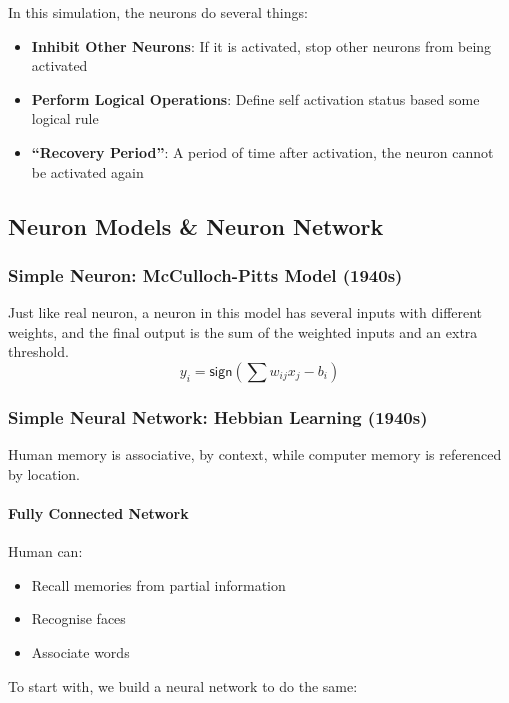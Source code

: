 \documentclass[a4paper, openany]{book}
\begin{document}
In this simulation, the neurons do several things:

\begin{itemize}
  \item \textbf{Inhibit Other Neurons}: If it is activated, stop other neurons from being activated
  \item \textbf{Perform Logical Operations}: Define self activation status based some logical rule
  \item \textbf{``Recovery Period''}: A period of time after activation, the neuron cannot be activated again
\end{itemize}

\subsection{Neuron Models \& Neuron Network}

\subsubsection{Simple Neuron: McCulloch-Pitts Model (1940s)}\label{sec:SimpleNeuron}

Just like real neuron, a neuron in this model has several inputs with different weights, and the final output is the sum of the weighted inputs and an extra threshold.
$$y_i = \mathsf{sign} (\sum w_{ij} x_j - b_i)$$

\subsubsection{Simple Neural Network: Hebbian Learning (1940s)}

Human memory is associative, by context, while computer memory is referenced by location.

\paragraph{Fully Connected Network}

Human can:

\begin{itemize}
  \item Recall memories from partial information
  \item Recognise faces
  \item Associate words
\end{itemize}

To start with, we build a neural network to do the same:
\end{document}
